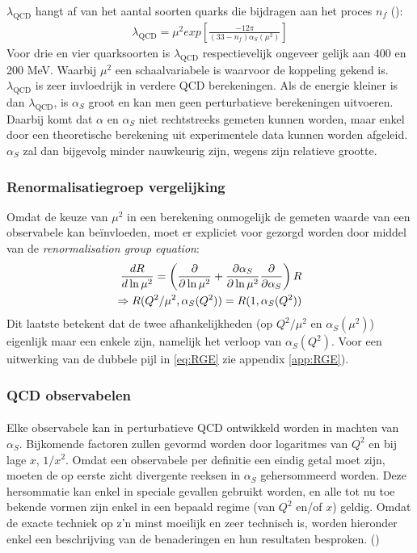 \documentclass[a4paper,11pt]{article}
\numberwithin{equation}{section} %
\begin{document}
$\lambda_\text{QCD}$ hangt af van het aantal soorten quarks die bijdragen aan het proces $n_f$ (\cite[sectie 6.6]{Bettini}):
\begin{align}
\lambda_\text{QCD} = \mu^2 exp \left[ \frac{-12\pi}{(33-n_f) \alpha_S(\mu^2)} \right]
\end{align}
Voor drie en vier quarksoorten is $\lambda_\text{QCD}$ respectievelijk ongeveer gelijk aan 400 en 200 MeV.
Waarbij $\mu^2$ een schaalvariabele is waarvoor de koppeling gekend is.
$\lambda_\text{QCD}$ is zeer invloedrijk in verdere QCD berekeningen.
Als de energie kleiner is dan $\lambda_\text{QCD}$, is $\alpha_S$ groot en kan men geen perturbatieve berekeningen uitvoeren.
Daarbij komt dat $\alpha$ en $\alpha_S$ niet rechtstreeks gemeten kunnen worden, maar enkel door een theoretische berekening uit experimentele data kunnen worden afgeleid.
$\alpha_S$ zal dan bijgevolg minder nauwkeurig zijn, wegens zijn relatieve grootte.

    \subsubsection{Renormalisatiegroep vergelijking}
Omdat de keuze van $\mu^2$ in een berekening onmogelijk de gemeten waarde van een observabele kan beïnvloeden, moet er expliciet voor gezorgd worden door middel van de \textit{renormalisation group equation}:
\begin{align} \label{eq:RGE}
\frac{d R}{d\ln{\mu^2}} = \left(\frac{\partial}{\partial \ln{\mu^2}} + \frac{\partial \alpha_S}{\partial \ln{\mu^2}} \frac{\partial}{\partial \alpha_S} \right) R \notag \\
\Rightarrow R(Q^2/\mu^2, \alpha_S(Q^2)) = R(1,\alpha_S(Q^2))
\end{align}
Dit laatste betekent dat de twee afhankelijkheden (op $Q^2/\mu^2$ en $\alpha_S(\mu^2)$) eigenlijk maar een enkele zijn, namelijk het verloop van $\alpha_S(Q^2)$. Voor een uitwerking van de dubbele pijl in \eqref{eq:RGE} zie appendix \ref{app:RGE}).

    \subsubsection{QCD observabelen} \label{sec:Observabelen}
      \paragraph{}
Elke observabele kan in perturbatieve QCD ontwikkeld worden in machten van $\alpha_S$.
Bijkomende factoren zullen gevormd worden door logaritmes van $Q^2$ en bij lage $x$, $1/x^2$.
Omdat een observabele per definitie een eindig getal moet zijn, moeten de op eerste zicht divergente reeksen in $\alpha_S$ gehersommeerd worden.
Deze hersommatie kan enkel in speciale gevallen gebruikt worden, en alle tot nu toe bekende vormen zijn enkel in een bepaald regime (van $Q^2$ en/of $x$) geldig.
Omdat de exacte techniek op z’n minst moeilijk en zeer technisch is, worden hieronder enkel een beschrijving van de benaderingen en hun resultaten besproken. (\cite[sectie 9.5.2]{Barone})
\end{document}
